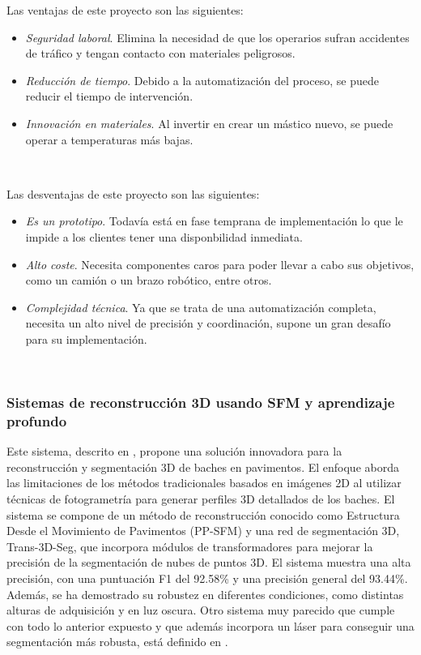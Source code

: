Las ventajas de este proyecto son las siguientes:

\begin{itemize}
	\item \textit{Seguridad laboral}. Elimina la necesidad de que los operarios sufran accidentes de tráfico y tengan contacto con materiales peligrosos.
	\item \textit{Reducción de tiempo}. Debido a la automatización del proceso, se puede reducir el tiempo de intervención.
	\item \textit{Innovación en materiales}. Al invertir en crear un mástico nuevo, se puede operar a temperaturas más bajas.
\end{itemize}\


Las desventajas de este proyecto son las siguientes:

\begin{itemize}
	\item \textit{Es un prototipo}. Todavía está en fase temprana de implementación lo que le impide a los clientes tener una disponbilidad inmediata.
	\item \textit{Alto coste}. Necesita componentes caros para poder llevar a cabo sus objetivos, como un camión o un brazo robótico, entre otros.
	\item \textit{Complejidad técnica}. Ya que se trata de una automatización completa, necesita un alto nivel de precisión y coordinación, supone un gran desafío para su implementación.
\end{itemize}\

\subsubsection{Sistemas de reconstrucción 3D usando SFM y aprendizaje profundo}


Este sistema, descrito en \cite{WANG2023132499}, propone una solución innovadora para la reconstrucción y segmentación 3D de baches en pavimentos. El enfoque aborda las limitaciones de los métodos tradicionales basados en imágenes 2D al utilizar técnicas de fotogrametría para generar perfiles 3D detallados de los baches. El sistema se compone de un método de reconstrucción conocido como Estructura Desde el Movimiento de Pavimentos (PP-SFM) y una red de segmentación 3D, Trans-3D-Seg, que incorpora módulos de transformadores para mejorar la precisión de la segmentación de nubes de puntos 3D. El sistema muestra una alta precisión, con una puntuación F1 del 92.58\% y una precisión general del 93.44\%. Además, se ha demostrado su robustez en diferentes condiciones, como distintas alturas de adquisición y en luz oscura. Otro sistema muy parecido que cumple con todo lo anterior expuesto y que además incorpora un láser para conseguir una segmentación más robusta, está definido en \cite{9345528}.

